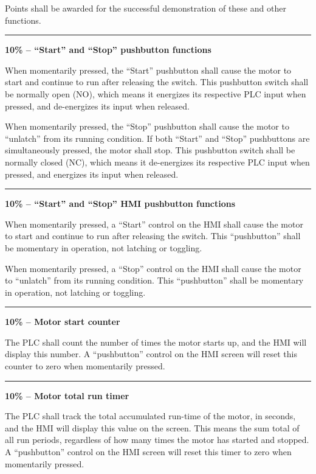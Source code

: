 \vskip 10pt

\noindent
Points shall be awarded for the successful demonstration of these and other functions.  

\vfil \eject

\hrule
\vskip 10pt

\noindent
{\bf 10\% -- ``Start'' and ``Stop'' pushbutton functions}

When momentarily pressed, the ``Start'' pushbutton shall cause the motor to start and continue to run after releasing the switch.  This pushbutton switch shall be normally open (NO), which means it energizes its respective PLC input when pressed, and de-energizes its input when released.

When momentarily pressed, the ``Stop'' pushbutton shall cause the motor to ``unlatch'' from its running condition.  If both ``Start'' and ``Stop'' pushbuttons are simultaneously pressed, the motor shall stop.  This pushbutton switch shall be normally closed (NC), which means it de-energizes its respective PLC input when pressed, and energizes its input when released.

\vskip 10pt
\hrule
\vskip 10pt

\noindent
{\bf 10\% -- ``Start'' and ``Stop'' HMI pushbutton functions}

When momentarily pressed, a ``Start'' control on the HMI shall cause the motor to start and continue to run after releasing the switch.  This ``pushbutton'' shall be momentary in operation, not latching or toggling.

When momentarily pressed, a ``Stop'' control on the HMI shall cause the motor to ``unlatch'' from its running condition.  This ``pushbutton'' shall be momentary in operation, not latching or toggling.

\vskip 10pt
\hrule
\vskip 10pt

\noindent
{\bf 10\% -- Motor start counter}

The PLC shall count the number of times the motor starts up, and the HMI will display this number.  A ``pushbutton'' control on the HMI screen will reset this counter to zero when momentarily pressed.

\vskip 10pt
\hrule
\vskip 10pt

\noindent
{\bf 10\% -- Motor total run timer}

The PLC shall track the total accumulated run-time of the motor, in seconds, and the HMI will display this value on the screen.  This means the sum total of all run periods, regardless of how many times the motor has started and stopped.  A ``pushbutton'' control on the HMI screen will reset this timer to zero when momentarily pressed.

